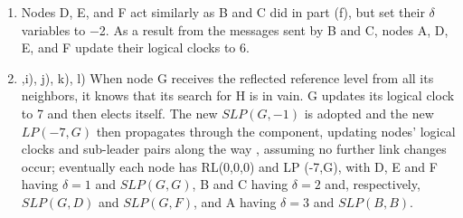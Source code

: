 \documentclass{article}
\begin{document}
\begin{enumerate}[label=\alph *)]
\newpage

\item Nodes D, E, and F act similarly as B and C did in part (f), but set their $\delta $ variables to −2. As a result from the messages sent by B and C, nodes A, D, E, and F update their logical clocks to 6.

\item  ,i), j), k), l) When node G receives the reflected reference level from all its neighbors, it knows that its search for H is in vain. G updates its logical clock to 7 and then elects itself. The new $SLP(G,-1)$ is adopted and the new $LP(-7,G)$ then propagates through the component, updating nodes’ logical clocks and sub-leader pairs along the way , assuming no further link changes occur; eventually each node has RL(0,0,0) and LP (-7,G), with D, E and F having $\delta = 1$ and $SLP(G,G)$, B and C having $\delta = 2$ and, respectively, $SLP(G,D)$ and $SLP(G,F)$, and A having $\delta = 3$ and $SLP(B,B)$.

\end{enumerate}
\newpage
\end{document}

